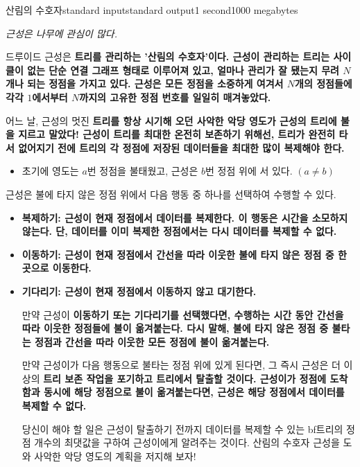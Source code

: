\begin{problem}{산림의 수호자}{standard input}{standard output}{1 second}{1000 megabytes}

  \it{근성은 나무에 관심이 많다.}


드루이드 근성은 \bf{트리}를 관리하는 '산림의 수호자'이다. 근성이 관리하는 \bf{트리}는 사이클이 없는 단순 연결 그래프 형태로 이루어져 있고, 얼마나 관리가 잘 됐는지 무려 $N$개나 되는 정점을 가지고 있다. 근성은 모든 정점을 소중하게 여겨서 $N$개의 정점들에 각각 $1$에서부터 $N$까지의 고유한 정점 번호를 일일히 매겨놓았다.


어느 날, 근성의 멋진 \bf{트리}를 항상 시기해 오던 사악한 악당 영도가 근성의 \bf{트리}에 불을 지르고 말았다! 근성이 \bf{트리}를 최대한 온전히 보존하기 위해선, \bf{트리}가 완전히 타서 없어지기 전에 \bf{트리}의 각 정점에 저장된 데이터들을 최대한 많이 복제해야 한다.


\begin{itemize}
  \item 초기에 영도는 $a$번 정점을 불태웠고, 근성은 $b$번 정점 위에 서 있다. $(a \neq b)$
\end{itemize}


근성은 불에 타지 않은 정점 위에서 다음 행동 중 하나를 선택하여 수행할 수 있다.


\begin{itemize}
  \item \bf{복제하기}: 근성이 현재 정점에서 데이터를 복제한다. 이 행동은 시간을 소모하지 않는다. 단, 데이터를 이미 복제한 정점에서는 다시 데이터를 복제할 수 없다.
  \item \bf{이동하기}: 근성이 현재 정점에서 간선을 따라 이웃한 불에 타지 않은 정점 중 한 곳으로 이동한다.
  \item \bf{기다리기}: 근성이 현재 정점에서 이동하지 않고 대기한다.


만약 근성이 \bf{이동하기} 또는 \bf{기다리기}를 선택했다면, 수행하는 시간 동안 간선을 따라 이웃한 정점들에 불이 옮겨붙는다. 다시 말해, 불에 타지 않은 정점 중 불타는 정점과 간선을 따라 이웃한 모든 정점에 불이 옮겨붙는다.


만약 근성이가 다음 행동으로 불타는 정점 위에 있게 된다면, 그 즉시 근성은 더 이상의 \bf{트리} 보존 작업을 포기하고 \bf{트리}에서 탈출할 것이다. 근성이가 정점에 도착함과 동시에 해당 정점으로 불이 옮겨붙는다면, 근성은 해당 정점에서 데이터를 복제할 수 없다.


당신이 해야 할 일은 근성이 탈출하기 전까지 데이터를 복제할 수 있는 bf{트리}의 정점 개수의 최댓값을 구하여 근성이에게 알려주는 것이다. 산림의 수호자 근성을 도와 사악한 악당 영도의 계획을 저지해 보자!


\end{itemize}
\end{problem}
